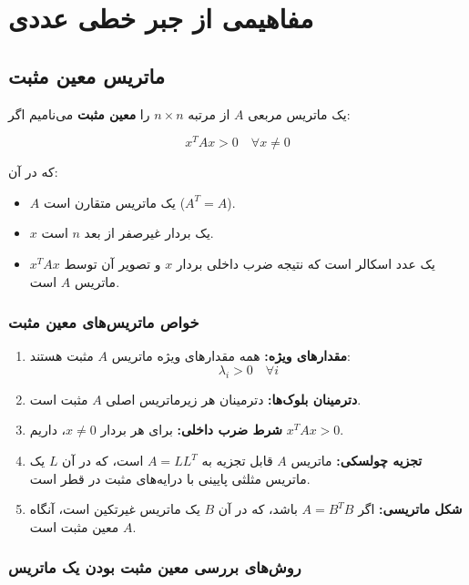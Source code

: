 \chapter{مفاهیمی از جبر خطی عددی}
\section{ماتریس معین مثبت}
\begin{definition}
	یک ماتریس مربعی \( A \) از مرتبه \( n \times n \) را \textbf{معین مثبت} می‌نامیم اگر:
	
	\[
	x^T A x > 0 \quad \forall x \neq 0
	\]
	
	که در آن:
	\begin{itemize}
		\item \( A \) یک ماتریس متقارن است (\( A^T = A \)).
		\item \( x \) یک بردار غیرصفر از بعد \( n \) است.
		\item \( x^T A x \) یک عدد اسکالر است که نتیجه ضرب داخلی بردار \( x \) و تصویر آن توسط ماتریس \( A \) است.
	\end{itemize}
\end{definition}
\subsection*{خواص ماتریس‌های معین مثبت}

\begin{enumerate}
	\item \textbf{‌مقدارهای ویژه:} 
	همه ‌مقدارهای ویژه ماتریس \( A \) مثبت هستند:
	\[
	\lambda_i > 0 \quad \forall i
	\]
	
	\item \textbf{دترمینان بلوک‌ها:} 
	دترمینان هر زیرماتریس اصلی \( A \) مثبت است.
	
	\item \textbf{شرط ضرب داخلی:} 
	برای هر بردار \( x \neq 0 \)، داریم \( x^T A x > 0 \).
	
	\item \textbf{تجزیه چولسکی:} 
	ماتریس \( A \) قابل تجزیه به \( A = L L^T \) است، که در آن \( L \) یک ماتریس مثلثی پایینی با درایه‌های مثبت در قطر است.
	
	\item \textbf{شکل ماتریسی:}
	اگر \( A = B^T B \) باشد، که در آن \( B \) یک ماتریس غیرتکین است، آنگاه \( A \) معین مثبت است.
\end{enumerate}

\subsection*{روش‌های بررسی معین مثبت بودن یک ماتریس}

